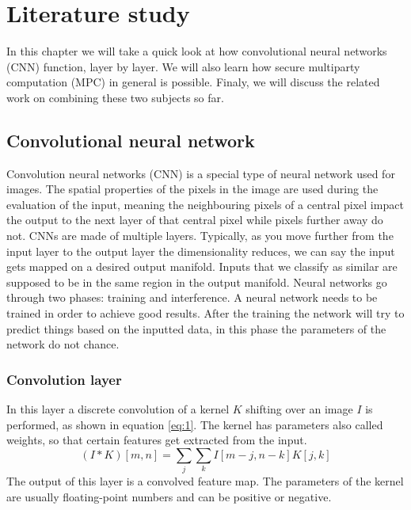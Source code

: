 
\chapter{Literature study}
In this chapter we will take a quick look at how convolutional neural networks (CNN) function, layer by layer. We will also learn how secure multiparty computation (MPC) in general is possible. Finaly, we will discuss the related work on combining these two subjects so far.

\section{Convolutional neural network}
Convolution neural networks (CNN) is a special type of neural network used for images. The spatial properties of the pixels in the image are used during the evaluation of the input, meaning the neighbouring pixels of a central pixel impact the output to the next layer of that central pixel while pixels further away do not.
CNNs are made of multiple layers. Typically, as you move further from the input layer to the output layer the dimensionality reduces, we can say the input gets mapped on a desired output manifold. Inputs that we classify as similar are supposed to be in the same region in the output manifold. Neural networks go through two phases: training and interference. A neural network needs to be trained in order to achieve good results. After the training the network will try to predict things based on the inputted data, in this phase the parameters of the network do not chance.

\subsection{Convolution layer}
In this layer a discrete convolution of a kernel $K$ shifting over an image $I$ is performed, as shown in equation \ref{eq:1}. The kernel has parameters also called weights, so that certain features get extracted from the input.
\begin{equation} \label{eq:1}
  (I*K)[m,n]=\sum_j\sum_k I[m-j,n-k]K[j,k]
\end{equation}
The output of this layer is a convolved feature map. The parameters of the kernel are usually floating-point numbers and can be positive or negative.

